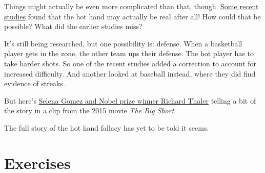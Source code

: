 \documentclass[justified]{tufte-book}
\theoremstyle{definition}
\theoremstyle{definition}
\theoremstyle{definition}
\theoremstyle{definition}
\theoremstyle{remark}
\begin{document}
Things might actually be even more complicated than that, though. \href{https://www.gsb.stanford.edu/insights/jeffrey-zwiebel-why-hot-hand-may-be-real-after-all}{Some recent studies} found that the hot hand may actually be real after all! How could that be possible? What did the earlier studies miss?

It's still being researched, but one possibility is: defense. When a basketball player gets in the zone, the other team ups their defense. The hot player has to take harder shots. So one of the recent studies added a correction to account for increased difficulty. And another looked at baseball instead, where they did find evidence of streaks.

\begin{marginfigure}
But here's \href{https://www.youtube.com/watch?v=Pxr_FzpPM2Q}{Selena
Gomez and Nobel prize winner Richard Thaler} telling a bit of the story
in a clip from the 2015 movie \emph{The Big Short}.
\end{marginfigure}

The full story of the hot hand fallacy has yet to be told it seems.

\hypertarget{exercises-3}{%
\section*{Exercises}\label{exercises-3}}
\end{document}
